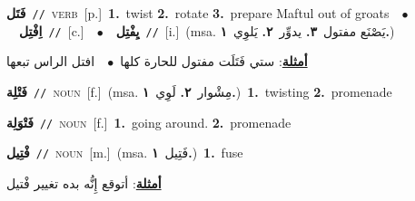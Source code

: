 \documentclass[10pt,a4paper,twoside]{article} %
\begin{document}
\begin{multicols}{2}
{\setlength\topsep{0pt}\textbf{\foreignlanguage{arabic}{فَتَل}}\ {\color{gray}\texttt{//}\color{black}}\ \textsc{verb}\ [p.]\ \textbf{1.}~twist  \textbf{2.}~rotate  \textbf{3.}~prepare Maftul out of groats\ \ $\bullet$\ \ \setlength\topsep{0pt}\textbf{\foreignlanguage{arabic}{اِفْتِل}}\ {\color{gray}\texttt{//}\color{black}}\ [c.]\ \ $\bullet$\ \ \setlength\topsep{0pt}\textbf{\foreignlanguage{arabic}{يِفْتِل}}\ {\color{gray}\texttt{//}\color{black}}\ [i.]\ \color{gray}(msa. \foreignlanguage{arabic}{يَصْنَع مفتول}~\foreignlanguage{arabic}{\textbf{٣.}}  \foreignlanguage{arabic}{يدوِّر}~\foreignlanguage{arabic}{\textbf{٢.}}  \foreignlanguage{arabic}{يَلوِي}~\foreignlanguage{arabic}{\textbf{١.}})\color{black}\  \begin{flushright}\color{gray}\foreignlanguage{arabic}{\textbf{\underline{\foreignlanguage{arabic}{أمثلة}}}: ستي فَتَلَت مفتول للحارة كلها\ $\bullet$\ \  افتل الراس تبعها}\end{flushright}\color{black}} \vspace{2mm}

{\setlength\topsep{0pt}\textbf{\foreignlanguage{arabic}{فَتْلِة}}\ {\color{gray}\texttt{//}\color{black}}\ \textsc{noun}\ [f.]\ \color{gray}(msa. \foreignlanguage{arabic}{مِشْوار}~\foreignlanguage{arabic}{\textbf{٢.}}  \foreignlanguage{arabic}{لَوِي}~\foreignlanguage{arabic}{\textbf{١.}})\color{black}\ \textbf{1.}~twisting  \textbf{2.}~promenade\ } \vspace{2mm}

{\setlength\topsep{0pt}\textbf{\foreignlanguage{arabic}{فَتْوَلِة}}\ {\color{gray}\texttt{//}\color{black}}\ \textsc{noun}\ [f.]\ \textbf{1.}~going around.  \textbf{2.}~promenade\ } \vspace{2mm}

{\setlength\topsep{0pt}\textbf{\foreignlanguage{arabic}{فْتِيل}}\ {\color{gray}\texttt{//}\color{black}}\ \textsc{noun}\ [m.]\ \color{gray}(msa. \foreignlanguage{arabic}{فَتِيل}~\foreignlanguage{arabic}{\textbf{١.}})\color{black}\ \textbf{1.}~fuse\  \begin{flushright}\color{gray}\foreignlanguage{arabic}{\textbf{\underline{\foreignlanguage{arabic}{أمثلة}}}: أتوقع إِنُّه بده تغيير فْتيل}\end{flushright}\color{black}} \vspace{2mm}


\end{multicols}
\end{document}

